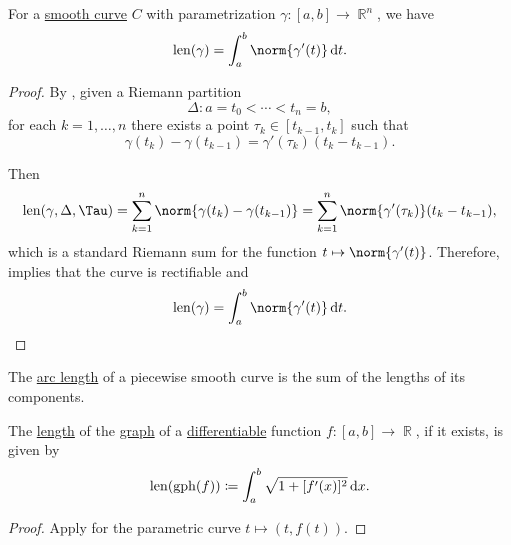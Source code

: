 \begin{proposition}\label{thm:length_of_smooth_curves}
  For a \hyperref[def:smooth_curve]{smooth curve} \( C \) with parametrization \( \gamma: [a, b] \to \BbbR^n \), we have
  \begin{equation*}
    \len(\gamma) = \int_a^b \norm{\gamma'(t)} \dl t.
  \end{equation*}
\end{proposition}
\begin{proof}
  By , given a Riemann partition
  \begin{equation*}
    \Delta: a = t_0 < \cdots < t_n = b,
  \end{equation*}
  for each \( k = 1, \ldots, n \) there exists a point \( \tau_k \in [t_{k-1}, t_k] \) such that
  \begin{equation*}
    \gamma(t_k) - \gamma(t_{k-1}) = \gamma'(\tau_k) (t_k - t_{k-1}).
  \end{equation*}

  Then
  \begin{equation*}
    \len(\gamma, \Delta, \Tau)
    =
    \sum_{k=1}^n \norm{\gamma(t_k) - \gamma(t_{k-1})}
    =
    \sum_{k=1}^n \norm{\gamma'(\tau_k)} (t_k - t_{k-1}),
  \end{equation*}
  which is a standard Riemann sum for the function \( t \mapsto \norm{\gamma'(t)} \). Therefore,  implies that the curve is rectifiable and
  \begin{equation*}
    \len(\gamma) = \int_a^b \norm{\gamma'(t)} \dl t.
  \end{equation*}
\end{proof}

\begin{corollary}\label{thm:length_of_piecewise_smooth_curves}
  The \hyperref[def:arc_length]{arc length} of a piecewise smooth curve is the sum of the lengths of its components.
\end{corollary}

\begin{corollary}\label{thm:length_of_function_graph}
  The \hyperref[def:arc_length]{length} of the \hyperref[def:set_valued_map/graph]{graph} of a \hyperref[def:differentiability/frechet]{differentiable} function \( f: [a, b] \to \BbbR \), if it exists, is given by
  \begin{equation*}
    \len(\gph(f)) \coloneqq \int_a^b \sqrt{1 + [f'(x)]^2} \dl x.
  \end{equation*}
\end{corollary}
\begin{proof}
  Apply  for the parametric curve \( t \mapsto (t, f(t)) \).
\end{proof}

